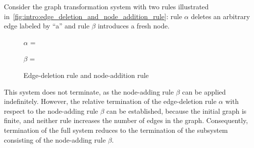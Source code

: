 Consider the graph transformation system with two rules illustrated in~\autoref{fig:intro:edge_deletion_and_node_addition_rule}: rule $\alpha$ deletes an arbitrary edge labeled by \enquote{a} and rule $\beta$ introduces a fresh node.
  \begin{figure}[hbtp]
        \centering
        $\alpha$ = {
                    }
    

        $\beta$ ={
                    }
    \caption{Edge-deletion rule and node-addition rule}
    \label{fig:intro:edge_deletion_and_node_addition_rule}
  \end{figure}
  This system does not terminate, as the node-adding rule $\beta$ can be applied indefinitely. However, the relative termination of the edge-deletion rule $\alpha$ with respect to the node-adding rule $\beta$ can be established, because the initial graph is finite, and neither rule increases the number of edges in the graph.
   Consequently, termination of the full system reduces to the termination of the subsystem consisting of the node-adding rule $\beta$.


